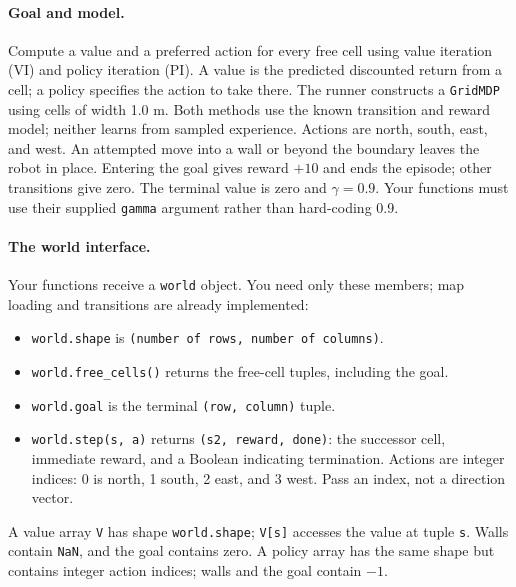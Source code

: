 \documentclass[11pt]{article}
\begin{document}
\paragraph{Goal and model.}
Compute a value and a preferred action for every free cell using value
iteration (VI) and policy iteration (PI). A value is the predicted
discounted return from a cell; a policy specifies the action to take
there. The runner constructs a \texttt{GridMDP} using cells of width
1.0 m. Both methods use the known
transition and reward model; neither learns from sampled experience.
Actions are north, south, east, and west. An attempted move into a wall
or beyond the boundary leaves the robot in place. Entering the goal
gives reward $+10$ and ends the episode; other transitions give zero.
The terminal value is zero and $\gamma=0.9$. Your functions must use
their supplied \texttt{gamma} argument rather than hard-coding 0.9.

\paragraph{The world interface.}
Your functions receive a \texttt{world} object. You need only these
members; map loading and transitions are already implemented:
\begin{itemize}
\item \texttt{world.shape} is \texttt{(number of rows, number of columns)}.
\item \texttt{world.free\_cells()} returns the free-cell tuples, including the goal.
\item \texttt{world.goal} is the terminal \texttt{(row, column)} tuple.
\item \texttt{world.step(s, a)} returns \texttt{(s2, reward, done)}:
the successor cell, immediate reward, and a Boolean indicating termination.
Actions are integer indices: 0 is north, 1 south, 2 east, and 3 west.
Pass an index, not a direction vector.
\end{itemize}
A value array \texttt{V} has shape \texttt{world.shape}; \texttt{V[s]}
accesses the value at tuple \texttt{s}. Walls contain \texttt{NaN}, and
the goal contains zero. A policy array has the same shape but contains
integer action indices; walls and the goal contain $-1$.
\end{document}
